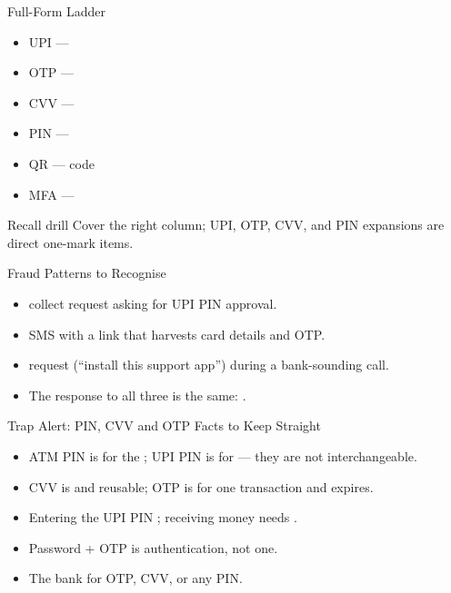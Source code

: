 \documentclass[aspectratio=169]{beamer}
\begin{document}
\begin{frame}{Full-Form Ladder}
  \begin{itemize}
    \item UPI --- 
    \item OTP --- 
    \item CVV --- 
    \item PIN --- 
    \item QR ---  code
    \item MFA --- 
  \end{itemize}
  \begin{alertblock}{Recall drill}
    Cover the right column; UPI, OTP, CVV, and PIN expansions are direct
    one-mark items.
  \end{alertblock}
\end{frame}

\begin{frame}{Fraud Patterns to Recognise}
  \begin{itemize}
    \item {} collect request asking for UPI PIN
      approval.
    \item {} SMS with a link that harvests card
      details and OTP.
    \item {} request (``install this support app'') during a
      bank-sounding call.
    \item The response to all three is the same: .
  \end{itemize}
\end{frame}

\begin{frame}{Trap Alert: PIN, CVV and OTP Facts to Keep Straight}
  \begin{itemize}
    \item ATM PIN is for the ; UPI PIN is for  --- they
      are not interchangeable.
    \item CVV is  and reusable; OTP is
       for one transaction and expires.
    \item Entering the UPI PIN ; receiving money needs
      .
    \item Password + OTP is  authentication, not one.
    \item The bank  for OTP, CVV, or any PIN.
  \end{itemize}
\end{frame}
\end{document}
